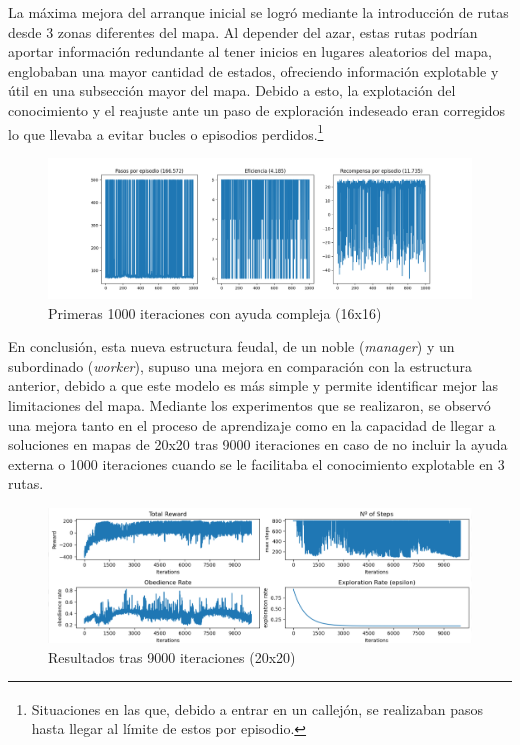\documentclass[letterpaper]{article} %
\begin{document}
La máxima mejora del arranque inicial se logró mediante la introducción de rutas desde 3 zonas diferentes del mapa. Al depender del azar, estas
 rutas podrían aportar información redundante al tener inicios en lugares aleatorios del mapa, englobaban una mayor cantidad de estados, ofreciendo
  información explotable y útil en una subsección mayor del mapa. Debido a esto, la explotación del conocimiento y el reajuste ante un paso de 
  exploración indeseado eran corregidos lo que llevaba a evitar bucles o episodios perdidos.\footnote{\textsuperscript{}Situaciones en las que, 
  debido a entrar en un callejón, se realizaban pasos hasta llegar al límite de estos por episodio.}

\begin{figure}[H]
    \centering
    \includegraphics[width=0.9\columnwidth]{ayuda_externa_3paths.png}
    \caption{Primeras 1000 iteraciones con ayuda compleja (16x16)\label{fig:FuN3}}
\end{figure}

En conclusión, esta nueva estructura feudal, de un noble (\textit{manager}) y un subordinado (\textit{worker}), supuso una mejora en comparación con la estructura anterior, debido a que este modelo es más simple y permite identificar mejor las limitaciones del mapa. Mediante los experimentos que se realizaron, se observó una mejora tanto en el proceso de aprendizaje como en la capacidad de llegar a soluciones en mapas de 20x20 tras 9000 iteraciones en caso de no incluir la ayuda externa o 1000 iteraciones cuando se le facilitaba el conocimiento explotable en 3 rutas. 

\begin{figure}[H]
    \centering
    \includegraphics[width=0.9\columnwidth]{QL_resumen_final.png}
    \caption{Resultados tras 9000 iteraciones (20x20)}
    \label{fig:FuN1}
\end{figure}
\end{document}
